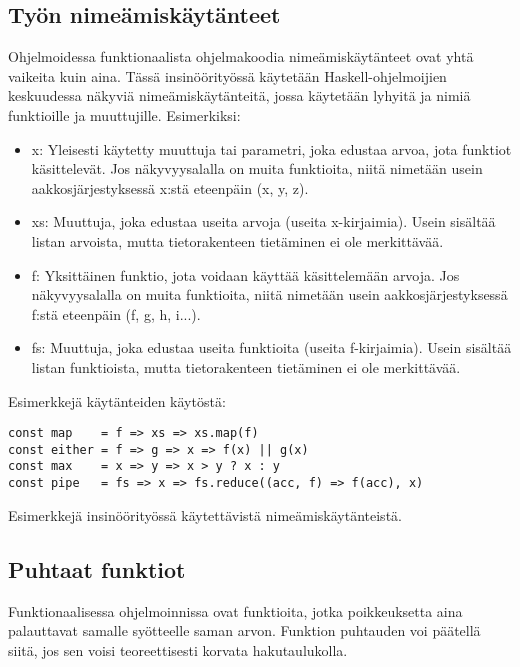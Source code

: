 \subsection{Työn nimeämiskäytänteet}

Ohjelmoidessa funktionaalista ohjelmakoodia nimeämiskäytänteet ovat yhtä vaikeita kuin aina. Tässä insinöörityössä käytetään Haskell-ohjelmoijien keskuudessa näkyviä nimeämiskäytänteitä, jossa käytetään lyhyitä ja  nimiä funktioille ja muuttujille. Esimerkiksi:

\begin{itemize}
    \item x: Yleisesti käytetty muuttuja tai parametri, joka edustaa arvoa, jota funktiot käsittelevät. Jos näkyvyysalalla on muita funktioita, niitä nimetään usein aakkosjärjestyksessä x:stä eteenpäin (x, y, z).
    \item xs: Muuttuja, joka edustaa useita arvoja (useita x-kirjaimia). Usein sisältää listan arvoista, mutta tietorakenteen tietäminen ei ole merkittävää.
    \item f: Yksittäinen funktio, jota voidaan käyttää käsittelemään arvoja. Jos näkyvyysalalla on muita funktioita, niitä nimetään usein aakkosjärjestyksessä f:stä eteenpäin (f, g, h, i...).
    \item fs: Muuttuja, joka edustaa useita funktioita (useita f-kirjaimia). Usein sisältää listan funktioista, mutta tietorakenteen tietäminen ei ole merkittävää.
\end{itemize}

Esimerkkejä käytänteiden käytöstä:

\begin{code}
    \begin{verbatim}
const map    = f => xs => xs.map(f)
const either = f => g => x => f(x) || g(x)
const max    = x => y => x > y ? x : y
const pipe   = fs => x => fs.reduce((acc, f) => f(acc), x)
\end{verbatim}
    \caption{Esimerkkejä insinöörityössä käytettävistä nimeämiskäytänteistä.}
    \label{code:javascript_naming_convention_example}
\end{code}

\subsection{Puhtaat funktiot}

Funktionaalisessa ohjelmoinnissa  ovat funktioita, jotka poikkeuksetta aina palauttavat samalle syötteelle saman arvon. Funktion puhtauden voi päätellä siitä, jos sen voisi teoreettisesti korvata hakutaulukolla. \citep{feldman_fp_pragmatists}

